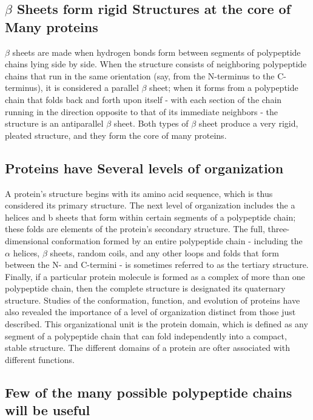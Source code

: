 \subsection{$\beta$ Sheets form rigid Structures at the core of Many proteins}

$\beta$ sheets are made when hydrogen bonds form between segments of polypeptide 
chains lying side by side. When the structure consists of neighboring polypeptide chains that
run in the same orientation (say, from the N-terminus to the C-terminus),
it is considered a parallel $\beta$ sheet; when it forms from a polypeptide chain
that folds back and forth upon itself - with each section of the chain running 
in the direction opposite to that of its immediate neighbors - the
structure is an antiparallel $\beta$ sheet. Both types of $\beta$ sheet
produce a very rigid, pleated structure, and they form the core of many
proteins.

\subsection{Proteins have Several levels of organization}

A protein’s structure begins with its
amino acid sequence, which is thus considered its primary structure. The
next level of organization includes the a helices and b sheets that form
within certain segments of a polypeptide chain; these folds are elements
of the protein’s secondary structure. The full, three-dimensional conformation 
formed by an entire polypeptide chain - including the $\alpha$ helices,
$\beta$ sheets, random coils, and any other loops and folds that form between
the N- and C-termini - is sometimes referred to as the tertiary structure. 
Finally, if a particular protein molecule is formed as a complex of more than one polypeptide
chain, then the complete structure is designated its quaternary structure.
Studies of the conformation, function, and evolution of proteins have
also revealed the importance of a level of organization distinct from
those just described. This organizational unit is the protein domain,
which is defined as any segment of a polypeptide chain that can fold
independently into a compact, stable structure.
The different domains of a protein are ofter associated with different functions.

\subsection{Few of the many possible polypeptide chains will be useful}

